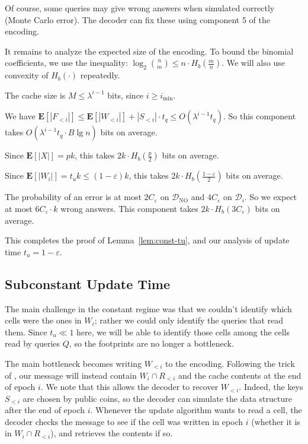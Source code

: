 \documentclass[letterpaper,11pt]{article}
\newenvironment{enumerate*}{\vspace{-1ex}\begin{enumerate}\setlength{\itemsep}{-0.5ex}\setlength{\parsep}{0pt}}{\end{enumerate}}
\newcommand{\eps}{\varepsilon}
\newcommand{\calD}{\mathcal{D}}
\newcommand{\Dno}{\calD_{\mathrm{NO}}}
\newcommand{\imin}{{i_{\min}}}
\newcommand{\E}{\mathbf{E}}
\begin{document}
Of course, some queries may give wrong answers when simulated
correctly (Monte Carlo error). The decoder can fix these using
component 5 of the encoding.

It remains to analyze the expected size of the encoding. To bound the
binomial coefficients, we use the inequality: $\log_2 \binom{n}{m} \le
n \cdot H_b(\frac{m}{n})$. We will also use convexity of $H_b(\cdot)$
repeatedly.
\begin{enumerate*}
\item The cache size is $M \le \lambda^{i-1}$ bits, since $i \ge
  \imin$. 

\item We have $\E[|F_{<i}|] \le \E[|W_{<i}|] + |S_{<i}|\cdot t_q \le
  O(\lambda^{i-1} t_q)$. So this component takes $O(\lambda^{i-1} t_q
  \cdot B\lg n)$ bits on average.

\item Since $\E[|X|] = pk$, this takes $2k \cdot H_b(\frac{p}{2})$
  bits on average.

\item Since $\E[|W_i|] = t_u k \le (1-\eps) k$, this takes $2k \cdot
  H_b(\frac{1-\eps}{2})$ bits on average.

\item The probability of an error is at most $2C_\eps$ on $\Dno$ and
  $4C_\eps$ on $\calD_i$. So we expect at most $6 C_\eps \cdot k$
  wrong answers. This component takes $2k \cdot H_b(3 C_\eps)$ bits on
  average.
\end{enumerate*}
\noindent
This completes the proof of Lemma~\ref{lem:const-tu}, and our analysis
of update time $t_u = 1-\eps$.



\subsection{Subconstant Update Time}

The main challenge in the constant regime was that we couldn't
identify which cells were the ones in $W_i$; rather we could only
identify the queries that read them. Since $t_u \ll 1$ here, we will
be able to identify those cells among the cells read by queries
$Q$, so the footprints are no longer a bottleneck.

The main bottleneck becomes writing $W_{<i}$ to the encoding.
Following the trick of \cite{patrascu07bit}, our message will instead
contain $W_i \cap R_{<i}$ and the cache contents at the end of epoch
$i$. We note that this allows the decoder to recover $W_{<i}$. Indeed,
the keys $S_{<i}$ are chosen by public coins, so the decoder can
simulate the data structure after the end of epoch $i$. Whenever the
update algorithm wants to read a cell, the decoder checks the message
to see if the cell was written in epoch $i$ (whether it is in $W_i
\cap R_{<i}$), and retrieves the contents if so.
\end{document}
